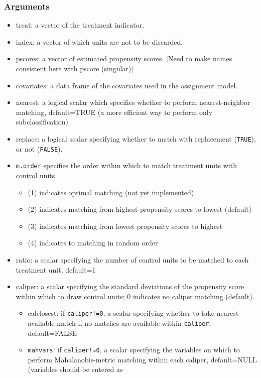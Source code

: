 \documentclass[oneside,letterpaper,titlepage]{article}
\begin{document}
\begin{appendix}
\subsubsection{Arguments}
\begin{itemize}
\item{treat}: a vector of the treatment indicator.
\item{index}: a vector of which units are not to be discarded.
\item{pscores}: a vector of estimated propensity scores.  [Need to
  make names consistent here with pscore (singular)]
\item{covariates}: a data frame of the covariates used in the
  assignment model.
\item{nearest}: a logical scalar which specifies whether
  to perform nearest-neighbor matching, default=TRUE (a more
  efficient way to perform only subclassification)
\item{replace}: a logical scalar specifying whether to match with
  replacement (\texttt{TRUE}), or not (\texttt{FALSE}). 
\item \texttt{m.order}  specifies the order within which to match
  treatment units with control units
  \begin{itemize}
  \item (1) indicates optimal matching (not yet implemented)
  \item (2) indicates matching from highest propensity scores to
    lowest (default)
  \item (3) indicates matching from lowest propensity scores to
    highest
  \item (4) indicates to matching in random order
  \end{itemize}
\item{ratio}: a scalar specifying the number of control units to be matched to
  each treatment unit, default=1
\item{caliper}: a scalar specifying the standard deviations of 
  the propensity score within which to draw control units; 0 indicates
  no caliper matching (default).
  \begin{itemize}
  \item{calclosest}: if \texttt{caliper!=0}, a scalar specifying whether to take nearest
    available match if no matches are available within \texttt{caliper}, default=FALSE
  \item\texttt{mahvars}: if \texttt{caliper!=0}, a scalar specifying
    the variables on which to perform Mahalanobis-metric matching
    within each caliper, default=NULL (variables should be entered as

\end{itemize}
\end{itemize}
\end{appendix}
\end{document}
